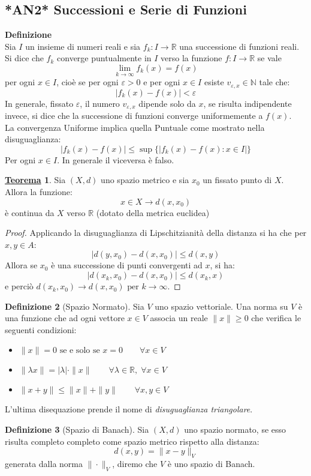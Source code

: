 \documentclass[a4paper,twoside]{article}
\renewcommand{\epsilon}{\varepsilon}
\newcommand{\N}{\mathbb{N}}
\newcommand{\R}{\mathbb{R}}
\theoremstyle{definition}
\newtheorem{theorem}{\color{Red}\underline{\textrm Teorema}}
\newtheorem{definizione}[theorem]{Definizione}
\numberwithin{theorem}{section}
\begin{document}
\subsection{*AN2* Successioni e Serie di Funzioni}
\textbf{Definizione}\\
Sia $I$ un insieme di numeri reali e sia $f_k:I\to\R$ una successione di funzioni reali. Si dice che $f_k$ converge puntualmente in $I$ verso la funzione $f:I\to\R$ se vale $$\lim_{k\to\infty} f_k(x)=f(x)$$
per ogni $x\in I$, cioè se per ogni $\epsilon>0$ e per ogni $x\in I$ esiste $v_{\epsilon,x}\in\N$ tale che:
$$|f_k(x)-f(x)|<\epsilon$$ In generale, fissato $\epsilon$, il numero  $v_{\epsilon,x}$ dipende solo da $x$, se risulta indipendente invece, si dice che la successione di funzioni converge uniformemente a $f(x)$.\\
La convergenza Uniforme implica quella Puntuale come mostrato nella disuguaglianza: $$|f_k(x) -f(x)|\leq \sup\{|f_k(x)-f(x): x\in I|\}$$
Per ogni $x\in I$. In generale il viceversa è falso.
\begin{theorem}
Sia $(X,d)$ uno spazio metrico e sia $x_0$ un fissato punto di $X$. Allora la funzione: $$x\in X\to d(x,x_0)$$
è continua da $X$ verso $\R$ (dotato della metrica euclidea)
\end{theorem}
\begin{proof}
    Applicando la disuguaglianza di Lipschitzianità della distanza si ha che per $x,y\in A$:
    $$|d(y,x_0)-d(x,x_0)|\leq d(x,y)$$
    Allora se $x_0$ è una successione di punti convergenti ad $x$, si ha: 
    $$|d(x_k,x_0)-d(x,x_0)|\leq d(x_k,x)$$
    e perciò $d(x_k,x_0)\to d(x,x_0)\text{ per } k\to\infty$.
\end{proof}
\begin{definizione}[Spazio Normato]
Sia $V$ uno spazio vettoriale. Una norma su $V$ è una funzione che ad ogni vettore $x\in V$ associa un reale $\|x\|\geq 0$ che verifica le seguenti condizioni:
\begin{itemize}
    \item $\|x\|=0 \text{ se e solo se } x=0 \qquad \forall x\in V$
    \item $\|\lambda x\|=|\lambda|\cdot\|x\|\qquad \forall\lambda\in\R,\; \forall x\in V$
    \item $\|x+y\|\leq \|x\|+\|y\|\qquad \forall x,y\in V$
\end{itemize}
\end{definizione}
L'ultima disequazione prende il nome di \emph{disuguaglianza triangolare}.
\begin{definizione}[Spazio di Banach]
Sia $(X,d)$ uno spazio normato, se esso risulta completo completo come spazio metrico rispetto alla distanza: $$d(x,y)=\|x-y\|_V$$ generata dalla norma $\|\cdot\|_V$, diremo che $V$ è uno spazio di Banach.    
\end{definizione}
\end{document}
